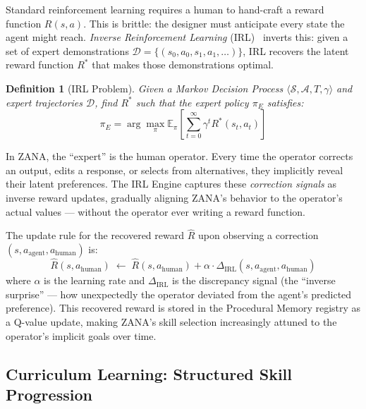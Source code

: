 \documentclass[12pt,a4paper]{article}
\newtheorem{definition}{Definition}[section]
\begin{document}
Standard reinforcement learning requires a human to hand-craft a reward function $R(s, a)$.
This is brittle: the designer must anticipate every state the agent might reach. \emph{Inverse
Reinforcement Learning} (IRL)~\cite{ng2000irl} inverts this: given a set of expert
demonstrations $\mathcal{D} = \{(s_0, a_0, s_1, a_1, \ldots)\}$, IRL recovers the
latent reward function $R^*$ that makes those demonstrations optimal.

\begin{definition}[IRL Problem]
Given a Markov Decision Process $\langle \mathcal{S}, \mathcal{A}, T, \gamma \rangle$ and
expert trajectories $\mathcal{D}$, find $R^*$ such that the expert policy $\pi_E$ satisfies:
\begin{equation}
  \pi_E = \arg\max_\pi \mathbb{E}_\pi\!\left[\sum_{t=0}^\infty \gamma^t R^*(s_t, a_t)\right]
\end{equation}
\end{definition}

\begin{tcolorbox}[insight]
In ZANA, the ``expert'' is the human operator. Every time the operator corrects an output,
edits a response, or selects from alternatives, they implicitly reveal their latent
preferences. The IRL Engine captures these \emph{correction signals} as inverse reward
updates, gradually aligning ZANA's behavior to the operator's actual values --- without
the operator ever writing a reward function.
\end{tcolorbox}

The update rule for the recovered reward $\hat{R}$ upon observing a correction
$(s, a_\text{agent}, a_\text{human})$ is:
\begin{equation}
  \hat{R}(s, a_\text{human}) \;\leftarrow\; \hat{R}(s, a_\text{human}) + \alpha \cdot
  \Delta_\text{IRL}(s, a_\text{agent}, a_\text{human})
\end{equation}
where $\alpha$ is the learning rate and $\Delta_\text{IRL}$ is the discrepancy signal
(the ``inverse surprise'' --- how unexpectedly the operator deviated from the agent's
predicted preference). This recovered reward is stored in the Procedural Memory registry
as a Q-value update, making ZANA's skill selection increasingly attuned to the operator's
implicit goals over time.

\subsection{Curriculum Learning: Structured Skill Progression}
\label{sec:curriculum}
\end{document}
